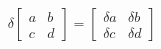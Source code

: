 \documentclass[preview]{standalone}
\begin{document}
\begin{align*}
\delta \begin{bmatrix} a & b \\ c & d \end{bmatrix} = \begin{bmatrix} \delta a & \delta b \\ \delta c & \delta d \end{bmatrix}
\end{align*}
\end{document}
